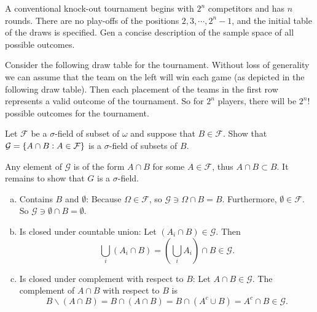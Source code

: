 \begin{problem}
	A conventional knock-out tournament begins with $ 2^n $ competitors and has $ n $ rounds. There are no play-offs of the positions $ 2,3,\cdots,2^{n}-1 $, and the initial table of the draws is specified. Gen a concise description of the sample space of all possible outcomes.
\end{problem}
\begin{solution}
	Consider the following draw table for the tournament. Without loss of generality we can assume that the team on the left will win each game (as depicted in the following draw table). Then each placement of the teams in the first row represents a valid outcome of the tournament. So for $ 2^n $ players, there will be $ 2^n! $ possible outcomes for the tournament.
	
\end{solution}

\begin{problem}
	Let $ \mathcal{F} $ be a $ \sigma $-field of subset of $ \omega $ and suppose that $ B\in\mathcal{F} $. Show that $ \mathcal{G} = \{A\cap B: A\in\mathcal{F}\}$ is a $ \sigma $-field of subsets of $ B $.
\end{problem}
\begin{solution}
	Any element of $ \mathcal{G} $ is of the form $ A\cap B $ for some $ A\in \mathcal{F} $, thus $ A\cap B \subset B $. It remains to show that $ G $ is a $ \sigma $-field.
	\begin{enumerate}[(a)]
		\item Contains $ B $ and $ \emptyset $: Because $ \Omega \in\mathcal{F} $, so $ \mathcal{G} \ni \Omega \cap B = B $. Furthermore, $ \emptyset\in\mathcal{F} $. So $ \mathcal{G} \ni \emptyset \cap B = \emptyset $.
		\item Is closed under countable union: Let $ (A_i\cap B) \in\mathcal{G} $. Then
		\[ \bigcup_i (A_i\cap B) = (\bigcup_i A_i) \cap B \in\mathcal{G}. \]
		\item Is closed under complement with respect to $ B $: Let $ A\cap B \in \mathcal{G} $. The complement of $ A\cap B $ with respect to $ B $ is
		\[ B\backslash(A\cap B) = B\cap(A\cap B) = B\cap(A^c\cup B) = A^c\cap B \in \mathcal{G}. \]
	\end{enumerate}
\end{solution}

